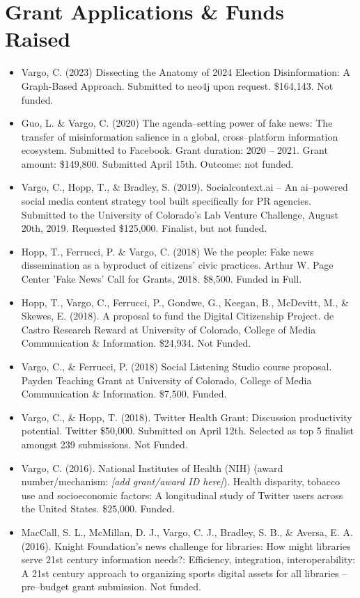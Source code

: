 \documentclass[11pt,letterpaper]{article}
\begin{document}
\section{Grant Applications \& Funds Raised}
{\small
\begin{itemize}
\item Vargo, C. (2023) Dissecting the Anatomy of 2024 Election Disinformation: A Graph-Based Approach. Submitted to neo4j upon request. \$164,143. Not funded.
\item Guo, L. \& Vargo, C. (2020) The agenda--setting power of fake news: The transfer of misinformation salience in a global, cross--platform information ecosystem. Submitted to Facebook. Grant duration: 2020 -- 2021. Grant amount: \$149,800. Submitted April 15th. Outcome: not funded.
\item Vargo, C., Hopp, T., \& Bradley, S. (2019). Socialcontext.ai -- An ai--powered social media content strategy tool built specifically for PR agencies. Submitted to the University of Colorado's Lab Venture Challenge, August 20th, 2019. Requested \$125,000. Finalist, but not funded.
\item Hopp, T., Ferrucci, P. \& Vargo, C. (2018) We the people: Fake news dissemination as a byproduct of citizens' civic practices. Arthur W. Page Center 'Fake News' Call for Grants, 2018. \$8,500. Funded in Full.
\item Hopp, T., Vargo, C., Ferrucci, P., Gondwe, G., Keegan, B., McDevitt, M., \& Skewes, E. (2018). A proposal to fund the Digital Citizenship Project. de Castro Research Reward at University of Colorado, College of Media Communication \& Information. \$24,934. Not Funded.
\item Vargo, C., \& Ferrucci, P. (2018) Social Listening Studio course proposal. Payden Teaching Grant at University of Colorado, College of Media Communication \& Information. \$7,500. Funded.
\item Vargo, C., \& Hopp, T. (2018). Twitter Health Grant: Discussion productivity potential. Twitter \$50,000. Submitted on April 12th. Selected as top 5 finalist amongst 239 submissions. Not Funded.
\item Vargo, C. (2016). National Institutes of Health (NIH) (award number/mechanism: \emph{[add grant/award ID here]}). Health disparity, tobacco use and socioeconomic factors: A longitudinal study of Twitter users across the United States. \$25,000. Funded.
\item MacCall, S. L., McMillan, D. J., Vargo, C. J., Bradley, S. B., \& Aversa, E. A. (2016). Knight Foundation's news challenge for libraries: How might libraries serve 21st century information needs?: Efficiency, integration, interoperability: A 21st century approach to organizing sports digital assets for all libraries -- pre--budget grant submission. Not funded.

\end{itemize}}
\end{document}
